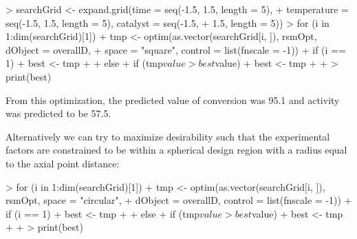 \documentclass[12pt]{article}
\begin{document}
{\small
\begin{Schunk}
\begin{Sinput}
> searchGrid <- expand.grid(time = seq(-1.5, 1.5, length = 5), 
+     temperature = seq(-1.5, 1.5, length = 5), catalyst = seq(-1.5, 
+         1.5, length = 5))
> for (i in 1:dim(searchGrid)[1]) {
+     tmp <- optim(as.vector(searchGrid[i, ]), rsmOpt, dObject = overallD, 
+         space = "square", control = list(fnscale = -1))
+     if (i == 1) {
+         best <- tmp
+     }
+     else {
+         if (tmp$value > best$value) 
+             best <- tmp
+     }
+ }
> print(best)
\end{Sinput}
\end{Schunk}
}

From this optimization, the predicted value of conversion was 95.1 and activity was predicted to be 57.5. 

Alternatively we can try to maximize desirability such that the experimental factors are constrained to be within a spherical design region with a radius equal to the axial point distance:

{\small
\begin{Schunk}
\begin{Sinput}
> for (i in 1:dim(searchGrid)[1]) {
+     tmp <- optim(as.vector(searchGrid[i, ]), rsmOpt, space = "circular", 
+         dObject = overallD, control = list(fnscale = -1))
+     if (i == 1) {
+         best <- tmp
+     }
+     else {
+         if (tmp$value > best$value) 
+             best <- tmp
+     }
+ }
> print(best)
\end{Sinput}
\end{Schunk}
}
\end{document}
